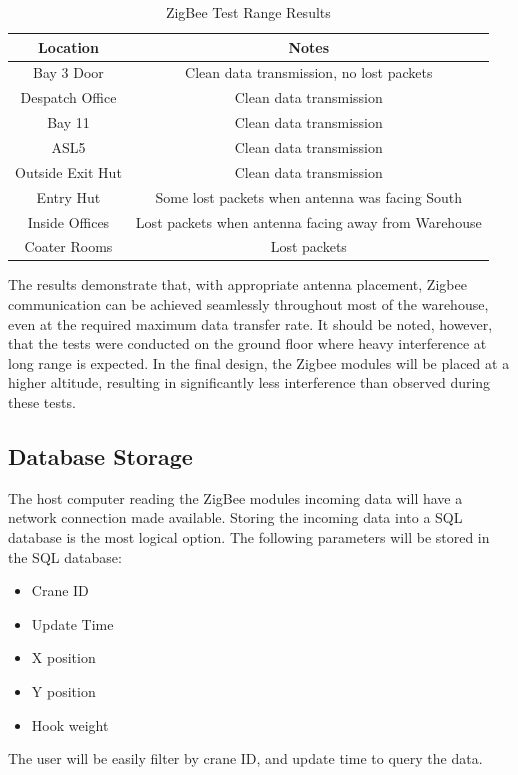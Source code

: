 \documentclass[12pt, a4paper]{article}
\begin{document}
\begin{center}
    \begin{table}[H]
        \begin{adjustbox}{width=1\textwidth, center=\textwidth}
            \small
            \begin{tabular}{||c c||}
                \hline
                Location & Notes \\
                \hline
                Bay 3 Door & Clean data transmission, no lost packets \\
                \hline
                Despatch Office & Clean data transmission \\
                \hline
                Bay 11 & Clean data transmission \\
                \hline
                ASL5 & Clean data transmission \\
                \hline
                Outside Exit Hut & Clean data transmission \\
                \hline
                Entry Hut & Some lost packets when antenna was facing South \\
                \hline
                Inside Offices & Lost packets when antenna facing away from Warehouse \\
                \hline
                Coater Rooms & Lost packets \\
                \hline
            \end{tabular}
        \end{adjustbox}
        \caption{ZigBee Test Range Results}
        \label{tab:zigbee_test}
    \end{table}
\end{center}
The results demonstrate that, with appropriate antenna placement, Zigbee communication can be achieved seamlessly throughout most of the warehouse, 
even at the required maximum data transfer rate. It should be noted, however, that the tests were conducted on the 
ground floor where heavy interference at long range is expected. In the final design, the Zigbee modules will be placed at a 
higher altitude, resulting in significantly less interference than observed during these tests.
\subsection{Database Storage}
The host computer reading the ZigBee modules incoming data will have a network connection made available.
Storing the incoming data into a SQL database is the most logical option. The following parameters will be stored in the SQL 
database:
\begin{itemize}
    \item Crane ID
    \item Update Time
    \item X position
    \item Y position
    \item Hook weight
\end{itemize}
The user will be easily filter by crane ID, and update time to query the data.
\end{document}
